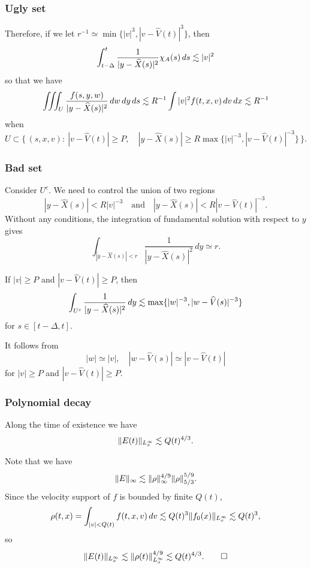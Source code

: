 \documentclass[11pt]{amsart}
\begin{document}
\subsubsection{Ugly set}

Therefore, if we let $r^{-1}\simeq\min\{|v|^3,|v-\hat V(t)|^3\}$, then
\[\int_{t-\Delta}^t\frac1{|y-\widehat X(s)|^2}\chi_A(s)\,ds\lesssim|v|^2\]
so that we have
\[\iiint_U\frac{f(s,y,w)}{|y-\widehat X(s)|^2}\,dw\,dy\,ds\lesssim R^{-1}\int|v|^2f(t,x,v)\,dv\,dx\lesssim R^{-1}\]
when
\[U\subset\{\,(s,x,v):\ |v-\hat V(t)|\ge P,\quad|y-\hat X(s)|\ge R\max\{|v|^{-3},|v-\hat V(t)|^{-3}\}\,\}.\]

\subsubsection{Bad set}
Consider $U^c$.
We need to control the union of two regions
\[|y-\hat X(s)|<R|v|^{-3}\quad\text{and}\quad|y-\hat X(s)|<R|v-\hat V(t)|^{-3}.\]
Without any conditions, the integration of fundamental solution with respect to $y$ gives
\[\int_{|y-\hat X(s)|<r}\frac1{|y-\hat X(s)|^2}\,dy\simeq r.\]
\begin{clm}
If $|v|\ge P$ and $|v-\hat V(t)|\ge P$, then
\[\int_{U^c}\frac1{|y-\widehat X(s)|^2}\,dy\lesssim\max\{|w|^{-3},|w-\widehat V(s)|^{-3}\}\]
for $s\in[t-\Delta,t]$.
\end{clm}
\begin{pf}
It follows from
\[|w|\simeq|v|,\quad|w-\hat V(s)|\simeq|v-\hat V(t)|\]
for $|v|\ge P$ and $|v-\hat V(t)|\ge P$.
\end{pf}

\subsubsection{Polynomial decay}
\begin{lem}
Along the time of existence we have
\[\|E(t)\|_{L_x^\infty}\lesssim Q(t)^{4/3}.\]
\end{lem}
\begin{pf}
Note that we have
\[\|E\|_\infty\lesssim\|\rho\|_\infty^{4/9}\|\rho\|_{5/3}^{5/9}.\]
Since the velocity support of $f$ is bounded by finite $Q(t)$,
\[\rho(t,x)=\int_{|v|<Q(t)}f(t,x,v)\,dv\lesssim Q(t)^3\|f_0(x)\|_{L_v^\infty}\lesssim Q(t)^3,\]
so
\[\|E(t)\|_{L_x^\infty}\lesssim\|\rho(t)\|_{L_x^\infty}^{4/9}\lesssim Q(t)^{4/3}.\qedhere\]
\end{pf}
\end{document}

